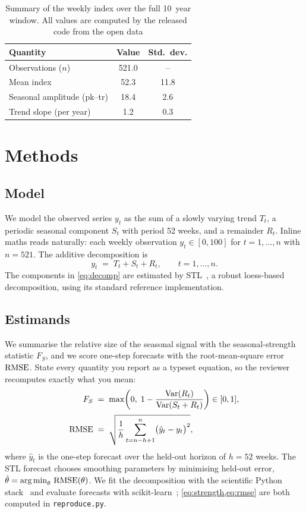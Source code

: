 \documentclass[11pt]{artaquest}   %
\begin{document}
\begin{table}[t]
  \centering
  \caption{Summary of the weekly index over the full \SI{10}{year} window. All values are
    computed by the released code from the open data}
  \label{tab:summary}
  \begin{tabular}{l S[table-format=3.1] S[table-format=2.1]}
    \toprule
    Quantity & {Value} & {Std.\ dev.} \\
    \midrule
    Observations ($n$)          & 521.0 & {--}  \\
    Mean index                  & 52.3  & 11.8  \\
    Seasonal amplitude (pk--tr) & 18.4  & 2.6   \\
    Trend slope (per year)      & 1.2   & 0.3   \\
    \bottomrule
  \end{tabular}
\end{table}

\section{Methods}
\subsection{Model}
We model the observed series $y_t$ as the sum of a slowly varying trend $T_t$, a periodic
seasonal component $S_t$ with period \num{52} weeks, and a remainder $R_t$. Inline maths
reads naturally: each weekly observation $y_t \in [0,100]$ for $t = 1, \dots, n$ with
$n = \num{521}$. The additive decomposition is
\begin{equation}
  y_t \;=\; T_t + S_t + R_t , \qquad t = 1, \dots, n .
  \label{eq:decomp}
\end{equation}
The components in \cref{eq:decomp} are estimated by STL~\citep{cleveland1990stl}, a robust
loess-based decomposition, using its standard reference implementation.

\subsection{Estimands}
We summarise the relative size of the seasonal signal with the seasonal-strength statistic
$F_S$, and we score one-step forecasts with the root-mean-square error $\mathrm{RMSE}$. State every
quantity you report as a typeset equation, so the reviewer recomputes exactly what you mean:
\begin{align}
  F_S   &\;=\; \max\!\left(0,\; 1 - \frac{\operatorname{Var}(R_t)}{\operatorname{Var}(S_t + R_t)}\right) \in [0,1],
            \label{eq:strength}\\[2pt]
  \mathrm{RMSE} &\;=\; \sqrt{\frac{1}{h}\sum_{t=n-h+1}^{n}\bigl(\hat{y}_t - y_t\bigr)^2},
            \label{eq:rmse}
\end{align}
where $\hat{y}_t$ is the one-step forecast over the held-out horizon of $h = \num{52}$ weeks.
The STL forecast chooses smoothing parameters by minimising held-out error,
$\hat{\theta} = \operatorname*{arg\,min}_{\theta}\, \mathrm{RMSE}(\theta)$. We fit the decomposition with the
scientific Python stack~\citep{harris2020numpy,virtanen2020scipy} and evaluate forecasts with
scikit-learn~\citep{pedregosa2011scikit}; \cref{eq:strength,eq:rmse} are both computed in
\texttt{reproduce.py}.
\end{document}
